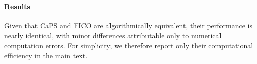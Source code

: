 \documentclass{article}
\theoremstyle{plain}
\theoremstyle{definition}
\theoremstyle{remark}
\begin{document}
\begin{table}[!htbp]
\caption{Runtime efficiency of FICO and CaPS, in seconds per sub-test.}
\vspace{-3mm}
\label{tab:multivariate-baseline-time-concise}
\begin{center}
\end{center}
\vspace{-5mm}
\end{table}%


\paragraph{Results}
Given that CaPS and FICO are algorithmically equivalent, their performance is nearly identical, with minor differences attributable only to numerical computation errors. For simplicity, we therefore report only their computational efficiency in the main text.
\end{document}
